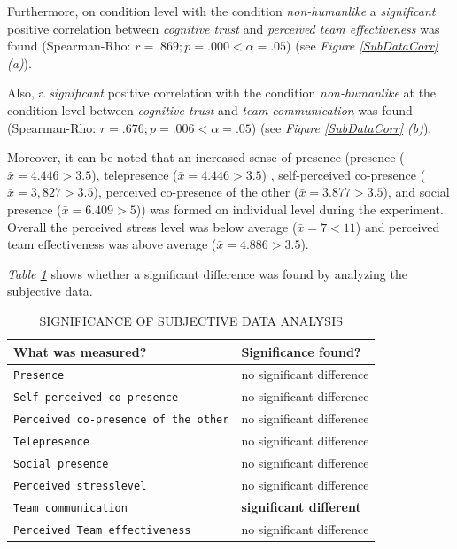 \documentclass[sigchi]{acmart}
\begin{document}
Furthermore, on condition level with the condition \textit{non-humanlike} a \textit{significant} positive correlation between \textit{cognitive trust} and \textit{perceived team effectiveness} was found (Spearman-Rho: $r =.869; p =.000 < \alpha = .05$) (see \textit{Figure \ref{SubDataCorr} (a)}).

Also, a \textit{significant} positive correlation with the condition \textit{non-humanlike} at the condition level between \textit{cognitive trust} and \textit{team communication} was found (Spearman-Rho: $r =.676; p =.006 < \alpha = .05$) (see \textit{Figure \ref{SubDataCorr} (b)}).

Moreover, it can be noted that an increased sense of presence (presence ($\bar{x} = 4.446 > 3.5$), telepresence ($\bar{x} = 4.446 > 3.5$) , self-perceived co-presence ($\bar{x} = 3, 827 > 3.5$), perceived co-presence of the other ($\bar{x} = 3.877 > 3.5$), and social presence ($\bar{x} = 6.409 > 5$)) was formed on individual level during the experiment. Overall the perceived stress level was below average ($\bar{x} = 7 < 11$) and perceived team effectiveness was above average ($\bar{x} = 4.886 > 3.5$).

\textit{Table \ref{SubDataSigs}} shows whether a significant difference was found by analyzing the subjective data.

\begin{table}
	\caption{SIGNIFICANCE OF SUBJECTIVE DATA ANALYSIS}
  \label{SubDataSigs}
  \begin{tabular}{ll}
    \toprule
    What was measured? & Significance found? \\
    \midrule
     \texttt{Presence} & no significant difference \\
   	 \texttt{Self-perceived co-presence} & no significant difference \\
     \texttt{Perceived co-presence of the other} & no significant difference  \\
     \texttt{Telepresence} & no significant difference \\
     \texttt{Social presence} & no significant difference \\
     \texttt{Perceived stresslevel} & no significant difference \\
     \texttt{Team communication} & \textbf{significant different} \\
     \texttt{Perceived Team effectiveness} & no significant difference  \\
    \bottomrule
  \end{tabular}
\end{table}
\end{document}
